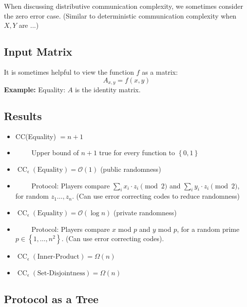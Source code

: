 \documentclass{article}
\begin{document}
When discussing distributive communication complexity, we sometimes consider the zero error case. (Similar to deterministic communication complexity when $X,Y$ are ...)

\subsection{Input Matrix}

It is sometimes helpful to view the function $f$ as a matrix:
\[
A_{x,y} = f(x,y)
\]
\textbf{Example:} Equality: $A$ is the identity matrix.

\subsection{Results}
\begin{itemize}
    \item CC(Equality) $= n+1$
    \item $\qquad$ Upper bound of $n+1$ true for every function to $\left\{0,1\right\}$
    \item $\operatorname{CC}_\epsilon\left(\text{Equality}\right)=\mathcal{O}(1)$ (public randomness)
    \item $\qquad$ Protocol: Players compare $\sum_{i} x_i\cdot z_i \pmod 2$ and $\sum_{i} y_i\cdot z_i \pmod 2$, for random $z_1\ldots, z_n$. (Can use error correcting codes to reduce randomness)
    \item $\operatorname{CC}_\epsilon\left(\text{Equality}\right)=\mathcal{O}(\log n)$ (private randomness)
    \item $\qquad$ Protocol: Players compare $x$ mod $p$ and $y$ mod $p$, for a random prime $p\in\left\{1,\ldots,n^2\right\}$. (Can use error correcting codes).
    \item $\operatorname{CC}_\epsilon\left(\text{Inner-Product}\right)=\Omega(n)$
    \item $\operatorname{CC}_\epsilon\left(\text{Set-Disjointness}\right)=\Omega(n)$
\end{itemize}

\subsection{Protocol as a Tree}
\end{document}
